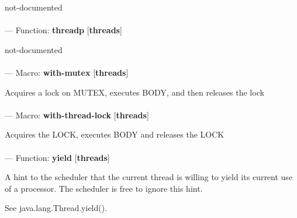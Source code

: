 \begin{adjustwidth}{5em}{5em}
not-documented
\end{adjustwidth}

\paragraph{}
\label{THREADS:THREADP}
--- Function: \textbf{threadp} [\textbf{threads}] \textit{}

\begin{adjustwidth}{5em}{5em}
not-documented
\end{adjustwidth}

\paragraph{}
\label{THREADS:WITH-MUTEX}
--- Macro: \textbf{with-mutex} [\textbf{threads}] \textit{}

\begin{adjustwidth}{5em}{5em}
Acquires a lock on MUTEX, executes BODY, and then releases the lock
\end{adjustwidth}

\paragraph{}
\label{THREADS:WITH-THREAD-LOCK}
--- Macro: \textbf{with-thread-lock} [\textbf{threads}] \textit{}

\begin{adjustwidth}{5em}{5em}
Acquires the LOCK, executes BODY and releases the LOCK
\end{adjustwidth}

\paragraph{}
\label{THREADS:YIELD}
--- Function: \textbf{yield} [\textbf{threads}] \textit{}

\begin{adjustwidth}{5em}{5em}
A hint to the scheduler that the current thread is willing to yield its current use of a processor. The scheduler is free to ignore this hint. 

See java.lang.Thread.yield().
\end{adjustwidth}

